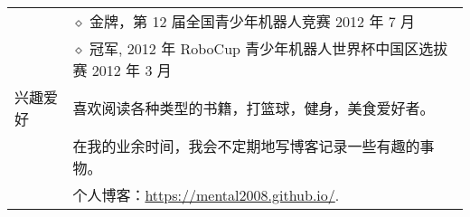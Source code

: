 \documentclass[letterpaper, 11pt]{article}
\begin{document}
\begin{longtable}{p{1.3in}p{4.8in}}
& $\diamond$ 金牌，第 12 届全国青少年机器人竞赛 \hfill 2012 年 7 月\\

& $\diamond$ 冠军, 2012 年 RoboCup 青少年机器人世界杯中国区选拔赛 \hfill 2012 年 3 月 \\


\nohyphens{兴趣爱好}
& 喜欢阅读各种类型的书籍，打篮球，健身，美食爱好者。 \\
& 在我的业余时间，我会不定期地写博客记录一些有趣的事物。 \\
& 个人博客：\href{https://mental2008.github.io/}{https://mental2008.github.io/}. \\



\end{longtable}
\end{document}
